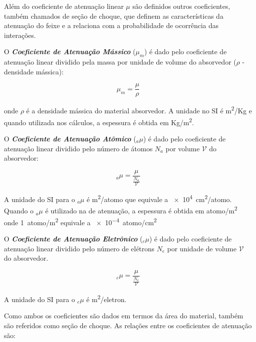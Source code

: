 \documentclass[11pt,a4paper]{article}
\begin{document}
    Além do coeficiente de atenuação linear $\mu$ são definidos outros coeficientes, também chamados de seção de choque, que definem as características da atenuação do feixe e a relaciona com a probabilidade de ocorrência das interações. 

    O \textbf{\textit{\textcolor{CarnationPink}{Coeficiente de Atenuação Mássico}}} ($\mu_m$) é dado pelo coeficiente de atenuação linear dividido pela massa por unidade de volume do absorvedor ($\rho$ - densidade mássica):

                \begin{equation}
                    \mu_m = \frac{\mu}{\rho}
                \end{equation}

    \noindent onde $\rho$ é a densidade mássica do material absorvedor. A unidade no SI é \unit{m^2/Kg} e quando utilizada nos cálculos, a espessura é obtida em \unit{Kg/m^2}.

    O \textbf{\textit{\textcolor{CarnationPink}{Coeficiente de Atenuação Atômico}}} (${}_a\mu$) é dado pelo coeficiente de atenuação linear dividido pelo número de átomos $N_a$ por volume $\mathcal{V}$ do absorvedor:

                \begin{equation}
                    {}_a\mu = \frac{\mu}{\frac{N_a}{\mathcal{V}}}
                \end{equation}

    \noindent A unidade do SI para o ${}_a\mu$ é \unit{m^2/atomo} que equivale a \qty{e4}{cm^2/atomo}. Quando o ${}_a\mu$ é utilizado na  de atenuação, a espessura é obtida em \unit{atomo/m^2} onde \qty{1}{atomo/m^2} equivale a \qty{e-4}{atomo/cm^2}


    O \textbf{\textit{\textcolor{CarnationPink}{Coeficiente de Atenuação Eletrônico}}} (${}_e\mu$) é dado pelo coeficiente de atenuação linear dividido pelo número de elétrons $N_e$ por unidade de volume $\mathcal{V}$ do absorvedor.

            \begin{equation}
                {}_e\mu = \frac{\mu}{\frac{N_e}{\mathcal{V}}}
            \end{equation}

    \noindent A unidade do SI para o ${}_e\mu$ é \unit{m^2/eletron}.

    Como ambos os coeficientes são dados em termos da área do material, também são referidos como seção de choque. As relações entre os coeficientes de atenuação são:
\end{document}
